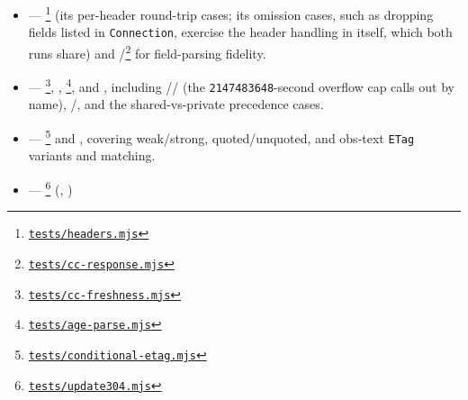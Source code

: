 \begin{itemize}
    \item {} ---
          \footnote{\href{https://github.com/http-tests/cache-tests/blob/b55b8bda3dbb8c927c04e85bd8d496a8caa3e4ba/tests/headers.mjs}{\texttt{tests/headers.mjs}}}
          (its per-header round-trip cases; its omission cases, such as
          dropping fields listed in \texttt{Connection}, exercise
          the header handling in  itself, which both runs share)
          and
          /\footnote{\href{https://github.com/http-tests/cache-tests/blob/b55b8bda3dbb8c927c04e85bd8d496a8caa3e4ba/tests/cc-response.mjs}{\texttt{tests/cc-response.mjs}}}
          for  field-parsing fidelity.
    \item {} ---
          \footnote{\href{https://github.com/http-tests/cache-tests/blob/b55b8bda3dbb8c927c04e85bd8d496a8caa3e4ba/tests/cc-freshness.mjs}{\texttt{tests/cc-freshness.mjs}}},
          ,
          \footnote{\href{https://github.com/http-tests/cache-tests/blob/b55b8bda3dbb8c927c04e85bd8d496a8caa3e4ba/tests/age-parse.mjs}{\texttt{tests/age-parse.mjs}}},
          and , including
          //
          (the \texttt{2147483648}-second overflow cap
           calls out by name),
          /, and the
           shared-vs-private precedence
          cases.
    \item {} ---
          \footnote{\href{https://github.com/http-tests/cache-tests/blob/b55b8bda3dbb8c927c04e85bd8d496a8caa3e4ba/tests/conditional-etag.mjs}{\texttt{tests/conditional-etag.mjs}}}
          and , covering weak/strong,
          quoted/unquoted, and obs-text \texttt{ETag} variants and
           matching.
    \item {} ---
          \footnote{\href{https://github.com/http-tests/cache-tests/blob/b55b8bda3dbb8c927c04e85bd8d496a8caa3e4ba/tests/update304.mjs}{\texttt{tests/update304.mjs}}}
          (, )

\end{itemize}
